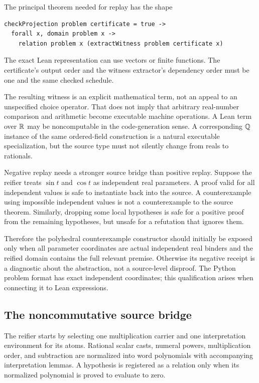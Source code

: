 The principal theorem needed for replay has the shape
\par\noindent\begin{minipage}{\linewidth}
\begin{lstlisting}
checkProjection problem certificate = true ->
  forall x, domain problem x ->
    relation problem x (extractWitness problem certificate x)
\end{lstlisting}
\end{minipage}\par
The exact Lean representation can use vectors or finite functions. The certificate's output order and the witness extractor's dependency order must be one and the same checked schedule.

The resulting witness is an explicit mathematical term, not an appeal to an unspecified choice operator. That does not imply that arbitrary real-number comparison and arithmetic become executable machine operations. A Lean term over \(\mathbb{R}\) may be noncomputable in the code-generation sense. A corresponding \(\mathbb{Q}\) instance of the same ordered-field construction is a natural executable specialization, but the source type must not silently change from reals to rationals.

Negative replay needs a stronger source bridge than positive replay. Suppose the reifier treats \(\sin t\) and \(\cos t\) as independent real parameters. A proof valid for all independent values is safe to instantiate back into the source. A counterexample using impossible independent values is not a counterexample to the source theorem. Similarly, dropping some local hypotheses is safe for a positive proof from the remaining hypotheses, but unsafe for a refutation that ignores them.

Therefore the polyhedral counterexample constructor should initially be exposed only when all parameter coordinates are actual independent real binders and the reified domain contains the full relevant premise. Otherwise its negative receipt is a diagnostic about the abstraction, not a source-level disproof. The Python problem format has exact independent coordinates; this qualification arises when connecting it to Lean expressions.

\subsection{The noncommutative source bridge}
The reifier starts by selecting one multiplication carrier and one interpretation environment for its atoms. Rational scalar casts, numeral powers, multiplication order, and subtraction are normalized into word polynomials with accompanying interpretation lemmas. A hypothesis is registered as a relation only when its normalized polynomial is proved to evaluate to zero.

